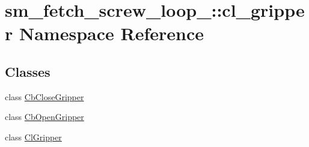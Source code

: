 \hypertarget{namespacesm__fetch__screw__loop__1_1_1cl__gripper}{}\section{sm\+\_\+fetch\+\_\+screw\+\_\+loop\+\_\+:\+:cl\+\_\+gripper Namespace Reference}
\label{namespacesm__fetch__screw__loop__1_1_1cl__gripper}
\subsection*{Classes}
\begin{DoxyCompactItemize}
\item 
class \hyperlink{classsm__fetch__screw__loop__1_1_1cl__gripper_1_1CbCloseGripper}{Cb\+Close\+Gripper}
\item 
class \hyperlink{classsm__fetch__screw__loop__1_1_1cl__gripper_1_1CbOpenGripper}{Cb\+Open\+Gripper}
\item 
class \hyperlink{classsm__fetch__screw__loop__1_1_1cl__gripper_1_1ClGripper}{Cl\+Gripper}
\end{DoxyCompactItemize}
